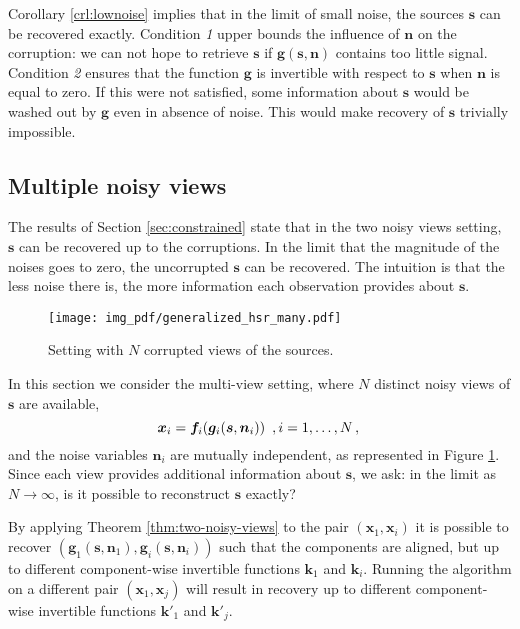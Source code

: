 Corollary \ref{crl:lownoise} implies that in the limit of small noise, the sources $\bm{s}$ can be recovered exactly.
Condition \textit{1} upper bounds the influence of $\bm{n}$ on the corruption: we can not hope to retrieve $\bm{s}$ if $\bm{g}(\bm{s}, \bm{n})$ contains too little signal.
Condition \textit{2} ensures that the function $\bm{g}$ is invertible with respect to $\bm{s}$ when $\bm{n}$ is equal to zero.
If this were not satisfied, some information about $\bm{s}$ would be washed out by $\bm{g}$ even in absence of noise.
This would make recovery of $\bm{s}$ trivially impossible.


\subsection{Multiple noisy views}
\label{sec:multiple}

The results of Section \ref{sec:constrained} state that in the two noisy views setting, $\bm{s}$ can be recovered up to the corruptions.
In the limit that the magnitude of the noises goes to zero, the uncorrupted $\bm{s}$ can be recovered.
The intuition is that the less noise there is, the more information each observation provides about $\bm{s}$.

\begin{figure}[t!]
	\centering
	\texttt{[image: img\_pdf/generalized\_hsr\_many.pdf]}
	\caption{Setting with $N$ corrupted views of the sources.}
	\label{fig:generalized_hsr_many}
\end{figure}

In this section we consider the multi-view setting, where $N$ distinct noisy views of $\bm{s}$ are available,
\begin{equation*}
\bm{x}_{i}=\bm{f}_{i}(\bm{g}_{i}(\bm{s},\bm{n}_{i}))\,\,\,,i=1, \ldots, N\,, \label{eq:multi}\\
\end{equation*}
and the noise variables $\bm{n}_{i}$ are mutually independent, as represented in Figure \ref{fig:generalized_hsr_many}.
Since each view provides additional information about $\bm{s}$, we ask: in the limit as $N \to \infty$, is it possible to reconstruct $\bm{s}$ exactly?


By applying Theorem \ref{thm:two-noisy-views} to the pair $(\bm{x}_1,\bm{x}_i)$ it is possible to recover  $(\bm{g}_1(\bm{s},\bm{n}_1),\bm{g}_i(\bm{s},\bm{n}_i))$ such that the components are aligned, but up to different component-wise invertible functions $\bm{k}_1$ and $\bm{k}_i$.
Running the algorithm on a different pair  $(\bm{x}_1,\bm{x}_{j})$ will result in recovery up to different component-wise invertible functions $\bm{k}'_1$ and $\bm{k}'_j$.

